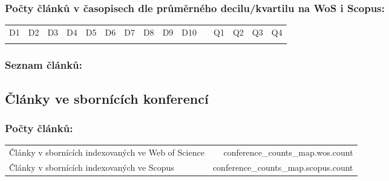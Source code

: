 {\subsubsection*{Počty článků v časopisech dle průměrného decilu/kvartilu na WoS i Scopus:}
\begin{center}
	\begin{tabular}{ccccccccccp{2cm}cccc}
		D1 & D2 & D3 & D4 & D5 & D6 & D7 & D8 & D9 & D10 & & Q1 & Q2 & Q3 & Q4\\
		\cline{1-10}\cline{12-15}
		{%
	\end{tabular}
\end{center}

\subsubsection*{Seznam článků:}



\subsection{Články ve sbornících konferencí}

\subsubsection*{Počty článků:}
\begin{tabular}{lr}
	Články v sbornících indexovaných ve Web of Science & {{conference_counts_map.wos.count}} \\
	Články v sbornících indexovaných ve Scopus & {{conference_counts_map.scopus.count}} \\
\end{tabular}

}
